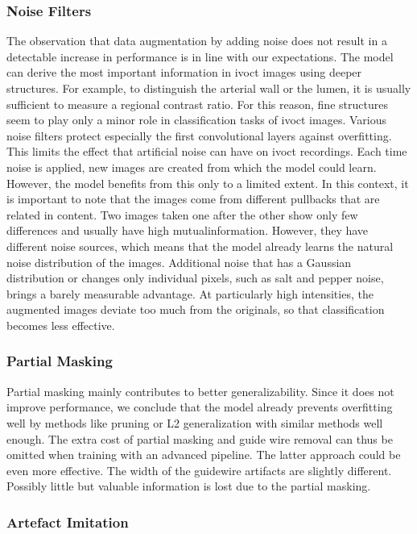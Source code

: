 \subsubsection{Noise Filters}

The observation that data augmentation by adding noise does not result in a detectable increase in performance is in line with our expectations. The model can derive the most important information in \acrshort{ivoct} images using deeper structures. For example, to distinguish the arterial wall or the lumen, it is usually sufficient to measure a regional contrast ratio. For this reason, fine structures seem to play only a minor role in classification tasks of \acrshort{ivoct} images. Various noise filters protect especially the first convolutional layers against \gls{overfitting}. This limits the effect that artificial noise can have on \acrshort{ivoct} recordings. Each time noise is applied, new images are created from which the model could learn. However, the model benefits from this only to a limited extent. In this context, it is important to note that the images come from different pullbacks that are related in content. Two images taken one after the other show only few differences and usually have high \gls{mutualinformation}. However, they have different noise sources, which means that the model already learns the natural noise distribution of the images. Additional noise that has a Gaussian distribution or changes only individual pixels, such as salt and pepper noise, brings a barely measurable advantage. At particularly high intensities, the augmented images deviate too much from the originals, so that classification becomes less effective.

\subsubsection{Partial Masking}

Partial masking mainly contributes to better generalizability. Since it does not improve performance, we conclude that the model already prevents \gls{overfitting} well by methods like pruning or L2 generalization with similar methods well enough. The extra cost of partial masking and guide wire removal can thus be omitted when training with an advanced pipeline. The latter approach could be even more effective. The width of the guidewire artifacts are slightly different. Possibly little but valuable information is lost due to the partial masking.

\subsubsection{Artefact Imitation}

